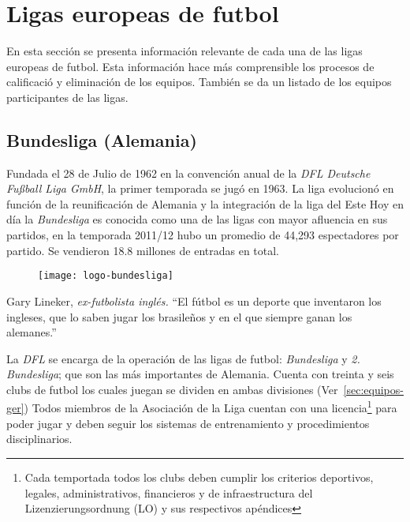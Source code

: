 \graphicspath{{/Users/brunomedina/Dropbox/Tesis-Egobets/egobets-notas/resources/marco/}}

\chapter{Ligas europeas de futbol}\label{chap:equipos}
En esta sección se presenta información relevante de cada una de las ligas europeas de futbol. Esta información hace más comprensible los procesos de calificació y eliminación de los equipos. También se da un listado de los equipos participantes de las ligas.


\section{Bundesliga (Alemania)}


Fundada el 28 de Julio de 1962 en la convención anual de la \emph{DFL Deutsche Fußball Liga GmbH}, la primer temporada se jugó en 1963. La liga evolucionó en función de la reunificación de Alemania y la integración de la liga del Este \cite{hesse2003tor} Hoy en día la \emph{Bundesliga} es conocida como una de las ligas con mayor afluencia en sus partidos, en la temporada 2011/12 hubo un promedio de 44,293 espectadores por partido. Se vendieron 18.8 millones de entradas en total.

\begin{figure}[!htb]\centering
   \begin {minipage}{0.4\textwidth}
     \texttt{[image: logo-bundesliga]}
   \end{minipage}
\end{figure}
\begin{chapquote}{Gary Lineker, \textit{ex-futbolista inglés.}}
	``El fútbol es un deporte que inventaron los ingleses, que lo saben jugar los brasileños y en el que siempre ganan los alemanes.''
\end{chapquote}


La \emph{DFL} se encarga de la operación de las ligas de futbol: \emph{Bundesliga} y \emph{2. Bundesliga}; que son las más importantes de Alemania. Cuenta con treinta y seis clubs de futbol los cuales juegan se dividen en ambas divisiones (Ver~\cref{sec:equipos-ger}) Todos miembros de la Asociación  de la Liga cuentan con una licencia\footnote{Cada temportada todos los clubs deben cumplir los criterios deportivos, legales, administrativos, financieros y de infraestructura del Lizenzierungsordnung (LO) y sus respectivos apéndices} para poder jugar y deben seguir los sistemas de entrenamiento y procedimientos disciplinarios.


